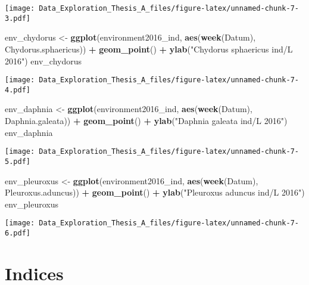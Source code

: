 \documentclass[]{article}
\newenvironment{Shaded}{\begin{snugshade}}{\end{snugshade}}
\newcommand{\KeywordTok}[1]{\textcolor[rgb]{0.13,0.29,0.53}{\textbf{#1}}}
\newcommand{\StringTok}[1]{\textcolor[rgb]{0.31,0.60,0.02}{#1}}
\newcommand{\OperatorTok}[1]{\textcolor[rgb]{0.81,0.36,0.00}{\textbf{#1}}}
\newcommand{\NormalTok}[1]{#1}
\begin{document}
\texttt{[image: Data\_Exploration\_Thesis\_A\_files/figure-latex/unnamed-chunk-7-3.pdf]}

\begin{Shaded}
\begin{Highlighting}[]
\NormalTok{env_chydorus <-}\StringTok{ }\KeywordTok{ggplot}\NormalTok{(environment2016_ind, }\KeywordTok{aes}\NormalTok{(}\KeywordTok{week}\NormalTok{(Datum), Chydorus.sphaericus)) }\OperatorTok{+}
\StringTok{  }\KeywordTok{geom_point}\NormalTok{() }\OperatorTok{+}
\StringTok{  }\KeywordTok{ylab}\NormalTok{(}\StringTok{"Chydorus sphaericus ind/L 2016"}\NormalTok{)}
\NormalTok{env_chydorus}
\end{Highlighting}
\end{Shaded}

\texttt{[image: Data\_Exploration\_Thesis\_A\_files/figure-latex/unnamed-chunk-7-4.pdf]}

\begin{Shaded}
\begin{Highlighting}[]
\NormalTok{env_daphnia <-}\StringTok{ }\KeywordTok{ggplot}\NormalTok{(environment2016_ind, }\KeywordTok{aes}\NormalTok{(}\KeywordTok{week}\NormalTok{(Datum), Daphnia.galeata)) }\OperatorTok{+}
\StringTok{  }\KeywordTok{geom_point}\NormalTok{() }\OperatorTok{+}
\StringTok{  }\KeywordTok{ylab}\NormalTok{(}\StringTok{"Daphnia galeata ind/L 2016"}\NormalTok{)}
\NormalTok{env_daphnia }
\end{Highlighting}
\end{Shaded}

\texttt{[image: Data\_Exploration\_Thesis\_A\_files/figure-latex/unnamed-chunk-7-5.pdf]}

\begin{Shaded}
\begin{Highlighting}[]
\NormalTok{env_pleuroxus <-}\StringTok{ }\KeywordTok{ggplot}\NormalTok{(environment2016_ind, }\KeywordTok{aes}\NormalTok{(}\KeywordTok{week}\NormalTok{(Datum), Pleuroxus.aduncus)) }\OperatorTok{+}
\StringTok{  }\KeywordTok{geom_point}\NormalTok{() }\OperatorTok{+}
\StringTok{  }\KeywordTok{ylab}\NormalTok{(}\StringTok{"Pleuroxus aduncus ind/L 2016"}\NormalTok{)}
\NormalTok{env_pleuroxus}
\end{Highlighting}
\end{Shaded}

\texttt{[image: Data\_Exploration\_Thesis\_A\_files/figure-latex/unnamed-chunk-7-6.pdf]}

\section{Indices}\label{indices}
\end{document}
